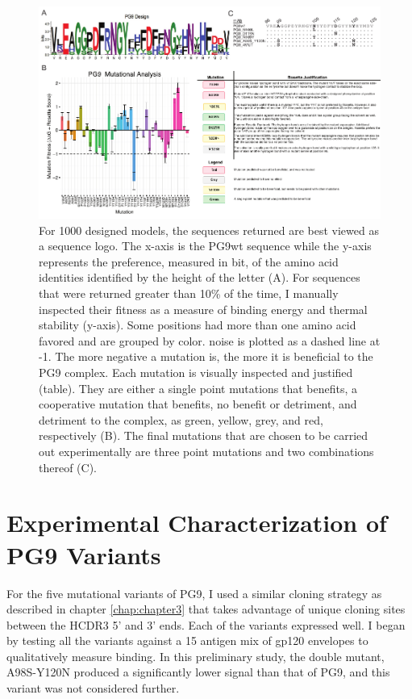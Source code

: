 \begin{figure}[!t]
   \centering
   \includegraphics[scale=1.5,width=.99\textwidth]{images/chapter4/figure4_3.pdf} %
   \caption[Redesign of PG9 HCDR3]{For 1000 designed models, the sequences returned are best viewed as a sequence logo. The x-axis is the PG9wt sequence while the y-axis represents the preference, measured in bit, of the amino acid identities identified by the height of the letter (A). For sequences that were returned greater than 10\% of the time, I manually inspected their fitness as a measure of binding energy and thermal stability (y-axis). Some positions had more than one amino acid favored and are grouped by color. \rosetta noise is plotted as a dashed line at -1. The more negative a mutation is, the more it is beneficial to the PG9 complex. Each mutation is visually inspected and justified (table). They are either a single point mutations that benefits, a cooperative mutation that benefits, no benefit or detriment, and detriment to the complex, as green, yellow, grey, and red, respectively (B). The final mutations that are chosen to be carried out experimentally are three point mutations and two combinations thereof (C).}
   \label{fig:figure4_3}
\end{figure}


\section{Experimental Characterization of PG9 Variants}
For the five mutational variants of PG9, I used a similar cloning strategy as described in chapter \ref{chap:chapter3} that takes advantage of unique cloning sites between the HCDR3 5' and 3' ends. Each of the variants expressed well. I began by testing all the variants against a 15 antigen mix of gp120 envelopes to qualitatively measure binding. In this preliminary study, the double mutant, A98S-Y120N produced a significantly lower signal than that of PG9, and this variant was not considered further.

